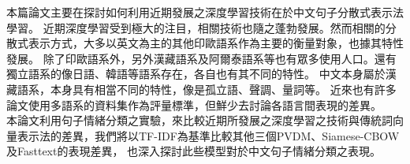 \begin{abstractCH}

本篇論文主要在探討如何利用近期發展之深度學習技術在於中文句子分散式表示法學習。 
近期深度學習受到極大的注目，相關技術也隨之蓬勃發展。然而相關的分散式表示方式，大多以英文為主的其他印歐語系作為主要的衡量對象，也據其特性發展。 
除了印歐語系外，另外漢藏語系及阿爾泰語系等也有眾多使用人口。還有獨立語系的像日語、韓語等語系存在，各自也有其不同的特性。
中文本身屬於漢藏語系，本身具有相當不同的特性，像是孤立語、聲調、量詞等。
近來也有許多論文使用多語系的資料集作為評量標準，但鮮少去討論各語言間表現的差異。\\

本論文利用句子情緒分類之實驗，來比較近期所發展之深度學習之技術與傳統詞向量表示法的差異，我們將以TF-IDF為基準比較其他三個PVDM、Siamese-CBOW及Fasttext的表現差異，
也深入探討此些模型對於中文句子情緒分類之表現。

\end{abstractCH}

